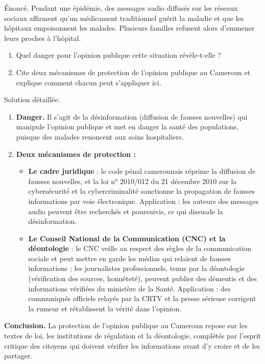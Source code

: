\documentclass[11pt]{article}
\newcommand{\cle}[1]{{\popxbold\color{popdark}#1}}
\begin{document}
\begin{exoresolu}
Énoncé. Pendant une épidémie, des messages audio diffusés sur les réseaux sociaux affirment qu'un médicament traditionnel guérit la maladie et que les hôpitaux empoisonnent les malades. Plusieurs familles refusent alors d'emmener leurs proches à l'hôpital.
\begin{enumerate}
\item Quel danger pour l'opinion publique cette situation révèle-t-elle ?
\item Cite deux mécanismes de protection de l'opinion publique au Cameroun et explique comment chacun peut s'appliquer ici.
\end{enumerate}
\tcblower
Solution détaillée.
\begin{enumerate}
\item \textbf{Danger.} Il s'agit de la \cle{désinformation} (diffusion de fausses nouvelles) qui manipule l'opinion publique et met en danger la santé des populations, puisque des malades renoncent aux soins hospitaliers.
\item \textbf{Deux mécanismes de protection :}
\begin{itemize}
\item \textbf{Le cadre juridique} : le code pénal camerounais réprime la diffusion de fausses nouvelles, et la loi n° 2010/012 du 21 décembre 2010 sur la cybersécurité et la cybercriminalité sanctionne la propagation de fausses informations par voie électronique. Application : les auteurs des messages audio peuvent être recherchés et poursuivis, ce qui dissuade la désinformation.
\item \textbf{Le Conseil National de la Communication (CNC) et la déontologie} : le CNC veille au respect des règles de la communication sociale et peut mettre en garde les médias qui relaient de fausses informations ; les journalistes professionnels, tenus par la déontologie (vérification des sources, honnêteté), peuvent publier des démentis et des informations vérifiées du ministère de la Santé. Application : des communiqués officiels relayés par la CRTV et la presse sérieuse corrigent la rumeur et rétablissent la vérité dans l'opinion.
\end{itemize}
\end{enumerate}
\textbf{Conclusion.} La protection de l'opinion publique au Cameroun repose sur les textes de loi, les institutions de régulation et la déontologie, complétés par l'esprit critique des citoyens qui doivent vérifier les informations avant d'y croire et de les partager.
\end{exoresolu}
\end{document}
